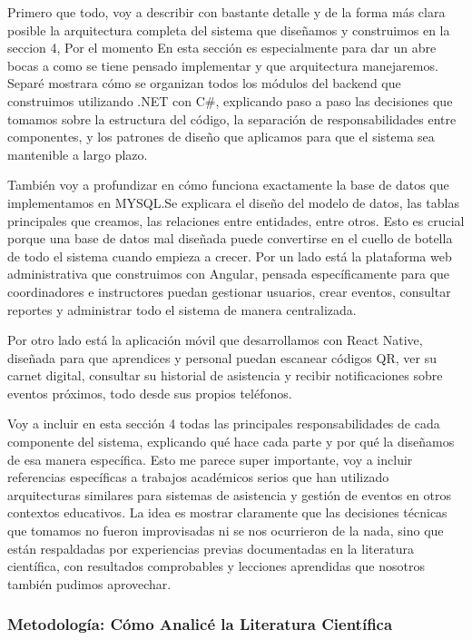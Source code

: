 Primero que todo, voy a describir con bastante detalle y de la forma más clara posible la arquitectura completa del sistema que diseñamos y construimos en la seccion 4, Por el momento En esta sección es especialmente para dar un abre bocas a como se tiene pensado implementar y que arquitectura manejaremos. Separé mostrara cómo se organizan todos los módulos del backend que construimos utilizando .NET con C\#, explicando paso a paso las decisiones que tomamos sobre la estructura del código, la separación de responsabilidades entre componentes, y los patrones de diseño que aplicamos para que el sistema sea mantenible a largo plazo.

También voy a profundizar en cómo funciona exactamente la base de datos que implementamos en MYSQL.Se explicara el diseño del modelo de datos, las tablas principales que creamos, las relaciones entre entidades, entre otros. Esto es crucial porque una base de datos mal diseñada puede convertirse en el cuello de botella de todo el sistema cuando empieza a crecer. Por un lado está la plataforma web administrativa que construimos con Angular, pensada específicamente para que coordinadores e instructores puedan gestionar usuarios, crear eventos, consultar reportes y administrar todo el sistema de manera centralizada. 

Por otro lado está la aplicación móvil que desarrollamos con React Native, diseñada para que aprendices y personal puedan escanear códigos QR, ver su carnet digital, consultar su historial de asistencia y recibir notificaciones sobre eventos próximos, todo desde sus propios teléfonos.

Voy a incluir en esta sección 4 todas las principales responsabilidades de cada componente del sistema, explicando qué hace cada parte y por qué la diseñamos de esa manera específica. Esto me parece super importante, voy a incluir referencias específicas a trabajos académicos serios que han utilizado arquitecturas similares para sistemas de asistencia y gestión de eventos en otros contextos educativos. La idea es mostrar claramente que las decisiones técnicas que tomamos no fueron improvisadas ni se nos ocurrieron de la nada, sino que están respaldadas por experiencias previas documentadas en la literatura científica, con resultados comprobables y lecciones aprendidas que nosotros también pudimos aprovechar.

\subsubsection*{Metodología: Cómo Analicé la Literatura Científica}

